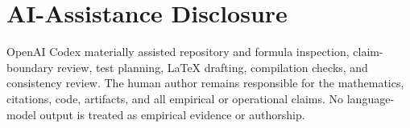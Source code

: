 \documentclass{article}
\begin{document}
\section{AI-Assistance Disclosure}

OpenAI Codex materially assisted repository and formula inspection, claim-boundary review, test planning, LaTeX drafting, compilation checks, and consistency review. The human author remains responsible for the mathematics, citations, code, artifacts, and all empirical or operational claims. No language-model output is treated as empirical evidence or authorship.
\end{document}
